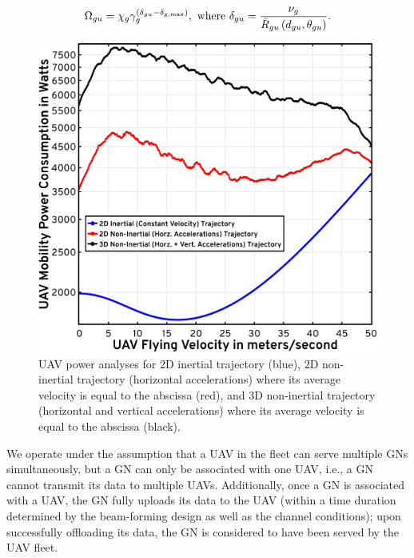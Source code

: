 \documentclass[10pt, twocolumn]{IEEEtran}
\begin{document}
\begin{align}\label{Reward}
    \Omega_{gu} = \chi_{g}\gamma_{g}^{(\delta_{gu} - \delta_{\mathrm{g,max}})},\text{ where }\delta_{gu} = \frac{\nu_{g}}{\Bar{R}_{gu}\left(d_{gu},\theta_{gu}\right)}.
\end{align}
\begin{figure} [t]
    \centering
    \includegraphics[width=1.0\linewidth]{figs/uav_mobility_power_model.png}
    \vspace{-5mm}
    \caption{UAV power analyses for $2$D inertial trajectory (blue), $2$D non-inertial trajectory (horizontal accelerations) where its average velocity is equal to the abscissa (red), and $3$D non-inertial trajectory (horizontal and vertical accelerations) where its average velocity is equal to the abscissa (black).}
    \label{F2}
    \vspace{-1mm}
\end{figure}
We operate under the assumption that a UAV in the fleet can serve multiple GNs simultaneously, but a GN can only be associated with one UAV, i.e., a GN cannot transmit its data to multiple UAVs. Additionally, once a GN is associated with a UAV, the GN fully uploads its data to the UAV (within a time duration determined by the beam-forming design as well as the channel conditions); upon successfully offloading its data, the GN is considered to have been served by the UAV fleet.\\
\end{document}
